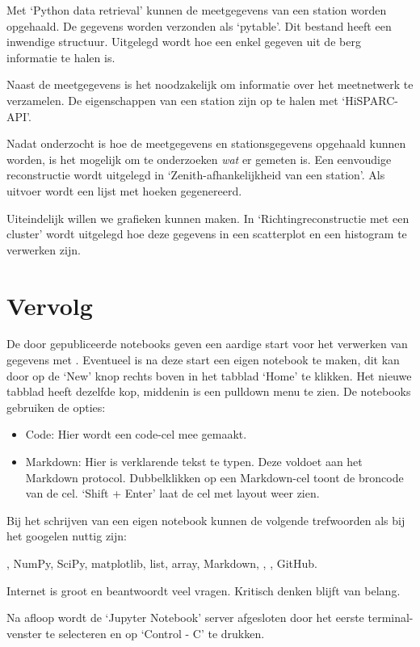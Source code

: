 Met `Python data retrieval' kunnen de meetgegevens van een station worden opgehaald. De gegevens worden verzonden als `pytable'. Dit bestand heeft een inwendige structuur. Uitgelegd wordt hoe een enkel gegeven uit de berg informatie te halen is. 

Naast de meetgegevens is het noodzakelijk om informatie over het meetnetwerk te verzamelen. De eigenschappen van een station zijn op te halen met `HiSPARC-API'.  

Nadat onderzocht is hoe de meetgegevens en stationsgegevens opgehaald kunnen worden, is het mogelijk om te onderzoeken \textit{wat} er gemeten is. Een eenvoudige reconstructie wordt uitgelegd in `Zenith-afhankelijkheid van een station'. Als uitvoer wordt een lijst met hoeken gegenereerd.

Uiteindelijk willen we grafieken kunnen maken. In `Richtingreconstructie met een cluster' wordt uitgelegd hoe deze gegevens in een scatterplot en een histogram te verwerken zijn.

\section{Vervolg}

De door \hisparc gepubliceerde notebooks geven een aardige start voor het verwerken van gegevens met \python.
Eventueel is na deze start een eigen notebook te maken, dit kan door op de `New' knop rechts boven in het tabblad `Home' te
klikken. Het nieuwe tabblad heeft dezelfde kop, middenin is een pulldown menu te zien. De notebooks gebruiken de opties:

\begin{itemize}
\item Code: Hier wordt een code-cel mee gemaakt.
\item Markdown: Hier is verklarende tekst te typen. Deze voldoet aan het Markdown protocol. Dubbelklikken op een Markdown-cel
toont de broncode van de cel. `Shift + Enter' laat de cel met layout weer zien.
\end{itemize}

Bij het schrijven van een eigen notebook kunnen de volgende trefwoorden als bij het googelen nuttig zijn:

\python, NumPy, SciPy, matplotlib, list, array, Markdown, \hisparc, \sapphire, GitHub.

Internet is groot en beantwoordt veel vragen. Kritisch denken blijft van belang.

Na afloop wordt de `Jupyter Notebook' server afgesloten door
het eerste terminal-venster te selecteren en op `Control - C' te drukken.


